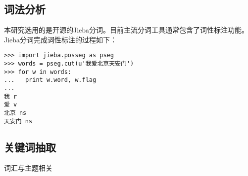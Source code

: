 
\subsection{词法分析}

本研究选用的是开源的Jieba分词。目前主流分词工具通常包含了词性标注功能。Jieba分词完成词性标注的过程如下：

\begin{verbatim}
>>> import jieba.posseg as pseg
>>> words = pseg.cut(u'我爱北京天安门')
>>> for w in words:
...   print w.word, w.flag
...
我 r
爱 v
北京 ns
天安门 ns
\end{verbatim}

\subsection{关键词抽取}

词汇与主题相关

